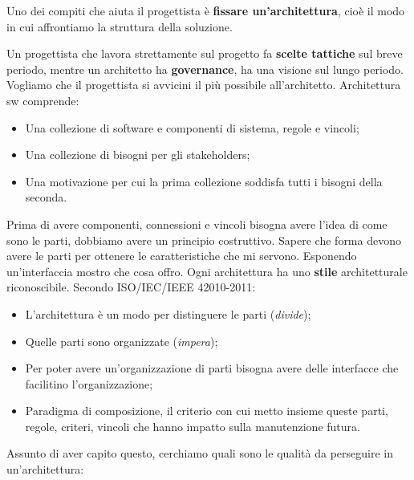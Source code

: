 Uno dei compiti che aiuta il progettista è \textbf{fissare un'architettura}, cioè il modo in cui affrontiamo la struttura della soluzione.

Un progettista che lavora strettamente sul progetto fa \textbf{scelte tattiche} sul breve periodo, mentre un architetto ha \textbf{governance}, ha una visione sul lungo periodo. Vogliamo che il progettista si avvicini il più possibile all'architetto. Architettura sw comprende:

\begin{itemize}

	\item Una collezione di software e componenti di sistema, regole e vincoli;
	\item Una collezione di bisogni per gli stakeholders;
	\item Una motivazione per cui la prima collezione soddisfa tutti i bisogni della seconda.
\end{itemize}


Prima di avere componenti, connessioni e vincoli bisogna avere l'idea di come sono le parti, dobbiamo avere un principio costruttivo. Sapere che forma devono avere le parti per ottenere le caratteristiche che mi servono. Esponendo un'interfaccia mostro che cosa offro. Ogni architettura ha uno \textbf{stile} architetturale riconoscibile. Secondo ISO/IEC/IEEE 42010-2011:

\begin{itemize}

	\item L'architettura è un modo per distinguere le parti (\textit{divide});
	\item Quelle parti sono organizzate (\textit{impera});
	\item Per poter avere un'organizzazione di parti bisogna avere delle interfacce che facilitino l'organizzazione;
	\item Paradigma di composizione, il criterio con cui metto insieme queste parti, regole, criteri, vincoli che hanno impatto sulla manutenzione futura.

\end{itemize}

Assunto di aver capito  questo, cerchiamo quali sono le qualità da perseguire in un'architettura:

